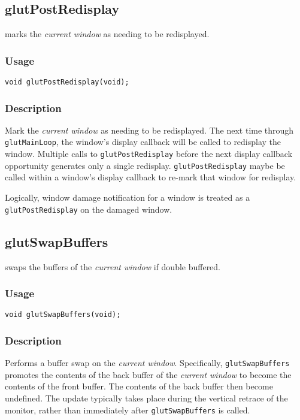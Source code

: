 \subsection{glutPostRedisplay}

 marks the {\em current window} as needing to be redisplayed.

\subsubsection*{Usage}
\begin{verbatim}
void glutPostRedisplay(void);
\end{verbatim}

\subsubsection*{Description}

Mark the {\em current window} as needing to be redisplayed.  The next time
through {\tt glutMainLoop}, the window's display callback will be called
to redisplay the window.  Multiple calls to {\tt glutPostRedisplay}
before the next display callback opportunity generates only a single
redisplay.  {\tt glutPostRedisplay} maybe be called within a window's
display callback to re-mark that window for redisplay.

Logically, window damage notification for a window is treated as a
{\tt glutPostRedisplay} on the damaged window.

\subsection{glutSwapBuffers}

 swaps the buffers of the {\em current window} if double buffered.

\subsubsection*{Usage}
\begin{verbatim}
void glutSwapBuffers(void);
\end{verbatim}

\subsubsection*{Description}

Performs a buffer swap on the {\em current window}.  Specifically, {\tt glutSwapBuffers}
promotes the contents of the back buffer of the {\em current window} to become the
contents of the front buffer.  The contents of the back buffer then
become undefined.  The update typically takes place during the vertical
retrace of the monitor, rather than immediately after {\tt glutSwapBuffers}
is called.

